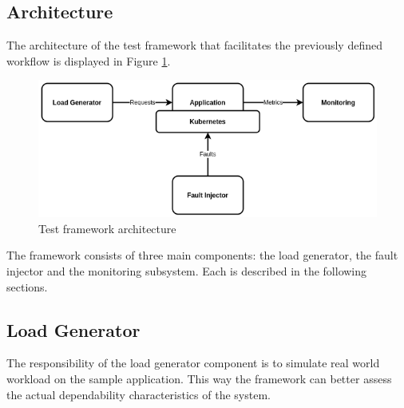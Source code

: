\subsection{Architecture}

The architecture of the test framework that facilitates the previously defined workflow is displayed in Figure \ref{fig:test_framework_arch}.

\begin{figure}[h]
	\centering
	\includegraphics[width=140mm, keepaspectratio]{figures/test_framework_arch.png}
	\caption{Test framework architecture}
	\label{fig:test_framework_arch}
\end{figure}

The framework consists of three main components: the load generator, the fault injector and the monitoring subsystem. Each is described in the following sections.




\subsection{Load Generator}


The responsibility of the load generator component is to simulate real world workload on the sample application. This way the framework can better assess the actual dependability characteristics of the system.

